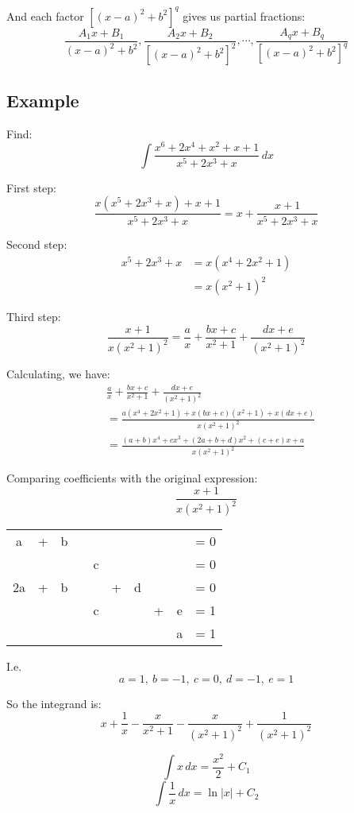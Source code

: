 \documentclass[11pt]{article}
\begin{document}
And each factor \([(x - a)^2 + b^2]^q\) gives us partial fractions:
\[\frac{A_1 x + B_1}{(x - a)^2 + b^2}, \frac{A_2 x + B_2}{[(x - a)^2 +b^2]^2}, \cdots, \frac{A_q x + B_q}{[(x - a)^2 + b^2]^q}\]

\subsection{Example}
\label{sec:org28f9330}
Find:
\[\int \frac{x^6 + 2x^4 + x^2 + x + 1}{x^ 5 + 2x^3 + x} \, dx\]

First step:
\[\frac{x(x^5 + 2x^3 + x) + x + 1}{x^5 + 2x^3 + x} = x + \frac{x + 1}{x^5 + 2x^3 + x}\]

Second step:
\begin{align*}
x^5 + 2x^3 + x &= x(x^4 + 2x^2 + 1) \\
&= x(x^2 + 1)^2
\end{align*}

Third step:
\[\frac{x + 1}{x(x^2 + 1)^2} = \frac{a}{x} + \frac{bx + c}{x^2 + 1} + \frac{dx + e}{(x^2 + 1)^2}\]

Calculating, we have:
\begin{align*}
&\frac{a}{x} + \frac{bx + c}{x^2 + 1} + \frac{dx + e}{(x^2 + 1)^2} \\
&= \frac{a(x^4 + 2x^2 + 1) + x(bx + c)(x^2 + 1) + x(dx + e)}{x(x^2 + 1)^2} \\
&= \frac{(a + b)x^4 + cx^3 + (2a + b + d)x^2 + (c + e)x + a}{x(x^2 + 1)^2}
\end{align*}

Comparing coefficients with the original expression:
\[\frac{x + 1}{x(x^2 + 1)^2}\]

\begin{center}
\begin{tabular}{c c c c c c c c c c}
a  & + & b &   &   &   &   &   &   &= 0 \\
   &   &   &   & c &   &   &   &   &= 0 \\
2a & + & b &   &   & + & d &   &   &= 0 \\
   &   &   &   & c &   &   & + & e &= 1 \\
   &   &   &   &   &   &   &   & a &= 1
\end{tabular}
\end{center}

I.e.
\[a = 1, \ b = -1, \ c = 0, \ d = -1, \ e = 1\]

So the integrand is:
\[x + \frac{1}{x} - \frac{x}{x^2 + 1} - \frac{x}{(x^2 + 1)^2} + \frac{1}{(x^2 + 1)^2}\]

\[\int x \, dx = \frac{x^2}{2} + C_1\]
\[\int \frac{1}{x} \, dx = \ln |x| + C_2\]
\end{document}
